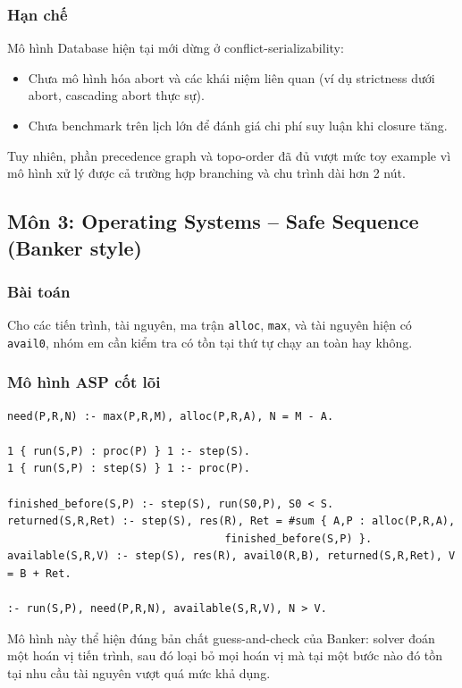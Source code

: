 ﻿\documentclass[11pt,a4paper]{article}
\begin{document}
\subsubsection*{Hạn chế}
Mô hình Database hiện tại mới dừng ở conflict-serializability:
\begin{itemize}[leftmargin=1.5em]
  \item Chưa mô hình hóa abort và các khái niệm liên quan (ví dụ strictness dưới abort, cascading abort thực sự).
  \item Chưa benchmark trên lịch lớn để đánh giá chi phí suy luận khi closure tăng.
\end{itemize}
Tuy nhiên, phần precedence graph và topo-order đã đủ vượt mức toy example vì mô hình xử lý được cả trường hợp branching và chu trình dài hơn 2 nút.

\subsection{Môn 3: Operating Systems -- Safe Sequence (Banker style)}
\subsubsection*{Bài toán}
Cho các tiến trình, tài nguyên, ma trận \texttt{alloc}, \texttt{max}, và tài nguyên hiện có \texttt{avail0}, nhóm em cần kiểm tra có tồn tại thứ tự chạy an toàn hay không.

\subsubsection*{Mô hình ASP cốt lõi}
\begin{lstlisting}[language={}]
need(P,R,N) :- max(P,R,M), alloc(P,R,A), N = M - A.

1 { run(S,P) : proc(P) } 1 :- step(S).
1 { run(S,P) : step(S) } 1 :- proc(P).

finished_before(S,P) :- step(S), run(S0,P), S0 < S.
returned(S,R,Ret) :- step(S), res(R), Ret = #sum { A,P : alloc(P,R,A),
                                  finished_before(S,P) }.
available(S,R,V) :- step(S), res(R), avail0(R,B), returned(S,R,Ret), V = B + Ret.

:- run(S,P), need(P,R,N), available(S,R,V), N > V.
\end{lstlisting}

Mô hình này thể hiện đúng bản chất guess-and-check của Banker: solver đoán một hoán vị tiến trình, sau đó loại bỏ mọi hoán vị mà tại một bước nào đó tồn tại nhu cầu tài nguyên vượt quá mức khả dụng.
\end{document}
